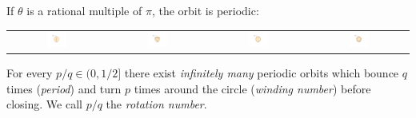 \documentclass[compress,aspectratio=169,10pt,usenames,dvipsnames]{beamer}
\begin{document}
\begin{frame}
If $\theta$ is a rational multiple of $\pi$, the orbit is periodic:


\begin{center}
\begin{tabular}{c c c c}
\includegraphics[width=0.22\textwidth]{CirclePeriod2} & \includegraphics[width=0.22\textwidth]{CirclePeriod3} & \includegraphics[width=0.22\textwidth]{CirclePeriod5} & \includegraphics[width=0.22\textwidth]{CirclePeriod7}    
\end{tabular}
\end{center}

For every $p/q \in (0,1/2]$ there exist \emph{infinitely many} periodic orbits which bounce $q$ times (\emph{period}) and turn $p$ times around the circle (\emph{winding number}) before closing. We call $p/q$ the \emph{rotation number}. 

\end{frame}
\end{document}
